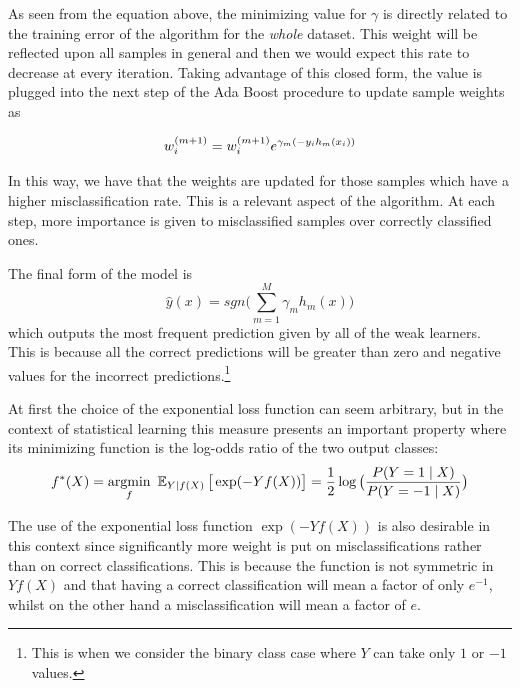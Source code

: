 As seen from the equation above, the minimizing value for $\gamma$ is directly related to the training error of the algorithm for the \textit{whole} dataset. This weight will be reflected upon all samples in general and then we would expect this rate to decrease at every iteration. Taking advantage of this closed form, the value is plugged into the next step of the Ada Boost procedure to update sample weights as

\begin{equation}
w_i^{(m+1)} =  w_i^{(m+1)} e^{\gamma_m(-y_i h_m(x_i))} \\
\end{equation}

In this way, we have that the weights are updated for those samples which have a higher misclassification rate. This is a relevant aspect of the algorithm. At each step, more importance is given to misclassified samples over correctly classified ones.



The final form of the model is
\begin{equation}
 \hat{y}(x) = sgn\big( \sum_{m=1}^{M} \gamma_m h_m(x) \big)
\end{equation}
  which outputs the most frequent prediction given by all of the weak learners. This is because all the correct predictions will be greater than zero and negative values for the incorrect predictions.\footnote{This is when we consider the binary class case where $Y$ can take only $1$ or $-1$ values.}

At first the choice of the exponential loss function can seem arbitrary, but in the context of statistical learning this measure presents an important property where its minimizing function is the log-odds ratio of the two output classes:
\begin{equation}
f^*(X) = \underset{f}{\mathrm{argmin}} \ \Expect_{Y | f(X)}\big[ \exp(-Yf(X)) \big] = \frac{1}{2}\log\big( \frac{ P(Y=1 \mid X) }{ P(Y=-1 \mid X) } \big)
\end{equation}


The use of the exponential loss function $\exp(-Yf(X))$ is also desirable in this context since significantly more weight is put on misclassifications rather than on correct classifications. This is because the function is not symmetric in $Yf(X)$ and that having a correct classification will mean a factor of only $e^{-1}$, whilst on the other hand a misclassification will mean a factor of $e$.


